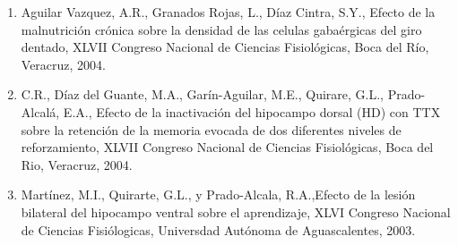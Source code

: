 \begin{enumerate}
\item  Aguilar Vazquez, A.R., Granados Rojas, L., Díaz Cintra, S.Y., Efecto de la malnutrición crónica sobre la densidad de 
las 
celulas gabaérgicas del giro dentado, XLVII Congreso Nacional de Ciencias Fisiológicas, Boca del Río, Veracruz, 2004.

\item  C.R., Díaz del Guante, M.A., Garín-Aguilar, M.E., Quirare, G.L., Prado-Alcalá, E.A., Efecto de la inactivación del 
hipocampo dorsal (HD) con TTX sobre la retención de la memoria evocada de dos diferentes niveles de reforzamiento, XLVII 
Congreso Nacional de Ciencias Fisiológicas, Boca del Rio, Veracruz, 2004.

\item  Martínez, M.I., Quirarte, G.L., y Prado-Alcala, R.A.,Efecto de la lesión bilateral del hipocampo ventral sobre el 
aprendizaje, XLVI Congreso Nacional de Ciencias Fisiólogicas, Universdad Autónoma de Aguascalentes, 2003.

\end{enumerate}

